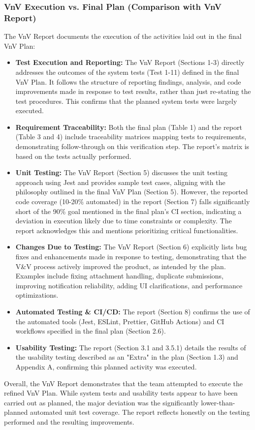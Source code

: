 \documentclass{article}
\begin{document}
\subsubsection{VnV Execution vs. Final Plan (Comparison with VnV Report)}

The VnV Report documents the execution of the activities laid out in the final VnV Plan:
\begin{itemize}
    \item \textbf{Test Execution and Reporting:} The VnV Report (Sections 1-3) directly addresses the outcomes of the system tests (Test 1-11) defined in the final VnV Plan. It follows the structure of reporting findings, analysis, and code improvements made in response to test results, rather than just re-stating the test procedures. This confirms that the planned system tests were largely executed.
    \item \textbf{Requirement Traceability:} Both the final plan (Table 1) and the report (Table 3 and 4) include traceability matrices mapping tests to requirements, demonstrating follow-through on this verification step. The report's matrix is based on the tests actually performed.
    \item \textbf{Unit Testing:} The VnV Report (Section 5) discusses the unit testing approach using Jest and provides sample test cases, aligning with the philosophy outlined in the final VnV Plan (Section 5). However, the reported code coverage (10-20\% automated) in the report (Section 7) falls significantly short of the 90\% goal mentioned in the final plan's CI section, indicating a deviation in execution likely due to time constraints or complexity. The report acknowledges this and mentions prioritizing critical functionalities.
    \item \textbf{Changes Due to Testing:} The VnV Report (Section 6) explicitly lists bug fixes and enhancements made in response to testing, demonstrating that the V\&V process actively improved the product, as intended by the plan. Examples include fixing attachment handling, duplicate submissions, improving notification reliability, adding UI clarifications, and performance optimizations.
    \item \textbf{Automated Testing \& CI/CD:} The report (Section 8) confirms the use of the automated tools (Jest, ESLint, Prettier, GitHub Actions) and CI workflows specified in the final plan (Section 2.6).
    \item \textbf{Usability Testing:} The report (Section 3.1 and 3.5.1) details the results of the usability testing described as an "Extra" in the plan (Section 1.3) and Appendix A, confirming this planned activity was executed.
\end{itemize}
Overall, the VnV Report demonstrates that the team attempted to execute the refined VnV Plan. While system tests and usability tests appear to have been carried out as planned, the major deviation was the significantly lower-than-planned automated unit test coverage. The report reflects honestly on the testing performed and the resulting improvements.
\end{document}
